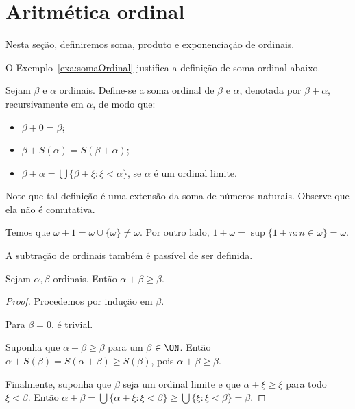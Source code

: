 \section{Aritmética ordinal}\label{sec:aritmeticaOrdinal}
Nesta seção, definiremos soma, produto e exponenciação de ordinais.

O Exemplo~\ref{exa:somaOrdinal} justifica a definição de soma ordinal abaixo.
\begin{definition}\label{def:somaOrdinal}
    Sejam $\beta$ e $\alpha$ ordinais.
    Define-se a soma ordinal de $\beta$ e $\alpha$, denotada por $\beta+\alpha$, recursivamente em $\alpha$, de modo que:
    \begin{itemize}
        \item $\beta+0=\beta$;
        \item $\beta+S(\alpha)=S(\beta+\alpha)$;
        \item $\beta+\alpha=\bigcup\{\beta+\xi : \xi <\alpha\}$, se $\alpha$ é um ordinal limite.
    \end{itemize}
\end{definition}

Note que tal definição é uma extensão da soma de números naturais.
Observe que ela não é comutativa.

\begin{example}\label{exa:somaOrdinalNaoComutativa}
    Temos que $\omega+1=\omega\cup\{\omega\}\neq \omega$.
    Por outro lado, $1+\omega=\sup\{1+n: n\in \omega\}=\omega$.
\end{example}


A subtração de ordinais também é passível de ser definida.

\begin{lemma}\label{lem:somaOrdinalMajorizaSegundoTermo}
    Sejam $\alpha, \beta$ ordinais.
    Então $\alpha+\beta\geq \beta$.
\end{lemma}
\begin{proof}
    Procedemos por indução em $\beta$.

    Para $\beta=0$, é trivial.

    Suponha que $\alpha+\beta\geq \beta$ para um $\beta\in \ON$.
    Então $\alpha+S(\beta)=S(\alpha+\beta)\geq S(\beta)$, pois $\alpha+\beta\geq \beta$.

    Finalmente, suponha que $\beta$ seja um ordinal limite e que $\alpha+\xi\geq \xi$ para todo $\xi<\beta$.
    Então $\alpha+\beta=\bigcup\{\alpha+\xi : \xi <\beta\}\geq \bigcup\{\xi : \xi <\beta\}=\beta$.
\end{proof}

